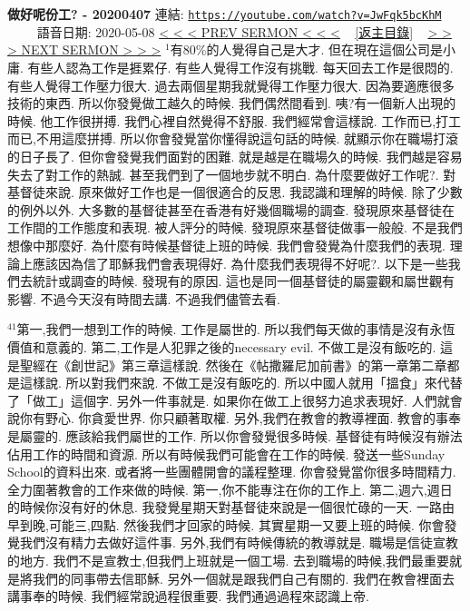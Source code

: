\documentclass{book}
\begin{document}
\section{}
\label{sec:JwFqk5bcKhM}
\textbf{做好呢份工? - 20200407}
\newline
\newline
連結: \href{https://youtube.com/watch?v=JwFqk5bcKhM}{\texttt{https://youtube.com/watch?v=JwFqk5bcKhM}} ~~~~ 語音日期: 2020-05-08
\newline
\newline
\hyperref[sec:UCyv23j5rVY]{\small{< < < PREV SERMON < < <}}
~
\hyperref[sec:index]{\small{[返主目錄]}}
~
\hyperref[sec:9pqygotXAuo]{\small{> > > NEXT SERMON > > >}}
\newline
\newline
$^{1}$有80\%的人覺得自己是大才.
但在現在這個公司是小庸.
有些人認為工作是捱累仔.
有些人覺得工作沒有挑戰.
每天回去工作是很悶的.
有些人覺得工作壓力很大.
過去兩個星期我就覺得工作壓力很大.
因為要適應很多技術的東西.
所以你發覺做工越久的時候.
我們偶然間看到.
咦?有一個新人出現的時候.
他工作很拼搏.
我們心裡自然覺得不舒服.
我們經常會這樣說.
工作而已,打工而已,不用這麼拼搏.
所以你會發覺當你懂得說這句話的時候.
就顯示你在職場打滾的日子長了.
但你會發覺我們面對的困難.
就是越是在職場久的時候.
我們越是容易失去了對工作的熱誠.
甚至我們到了一個地步就不明白.
為什麼要做好工作呢?.
對基督徒來說.
原來做好工作也是一個很適合的反思.
我認識和理解的時候.
除了少數的例外以外.
大多數的基督徒甚至在香港有好幾個職場的調查.
發現原來基督徒在工作間的工作態度和表現.
被人評分的時候.
發現原來基督徒做事一般般.
不是我們想像中那麼好.
為什麼有時候基督徒上班的時候.
我們會發覺為什麼我們的表現.
理論上應該因為信了耶穌我們會表現得好.
為什麼我們表現得不好呢?.
以下是一些我們去統計或調查的時候.
發現有的原因.
這也是同一個基督徒的屬靈觀和屬世觀有影響.
不過今天沒有時間去講.
不過我們儘管去看.

$^{41}$第一,我們一想到工作的時候.
工作是屬世的.
所以我們每天做的事情是沒有永恆價值和意義的.
第二,工作是人犯罪之後的necessary evil.
不做工是沒有飯吃的.
這是聖經在《創世記》第三章這樣說.
然後在《帖撒羅尼加前書》的第一章第二章都是這樣說.
所以對我們來說.
不做工是沒有飯吃的.
所以中國人就用「搵食」來代替了「做工」這個字.
另外一件事就是.
如果你在做工上很努力追求表現好.
人們就會說你有野心.
你貪愛世界.
你只顧著取權.
另外,我們在教會的教導裡面.
教會的事奉是屬靈的.
應該給我們屬世的工作.
所以你會發覺很多時候.
基督徒有時候沒有辦法佔用工作的時間和資源.
所以有時候我們可能會在工作的時候.
發送一些Sunday School的資料出來.
或者將一些團體開會的議程整理.
你會發覺當你很多時間精力.
全力圍著教會的工作來做的時候.
第一,你不能專注在你的工作上.
第二,週六,週日的時候你沒有好的休息.
我發覺星期天對基督徒來說是一個很忙碌的一天.
一路由早到晚,可能三,四點.
然後我們才回家的時候.
其實星期一又要上班的時候.
你會發覺我們沒有精力去做好這件事.
另外,我們有時候傳統的教導就是.
職場是信徒宣教的地方.
我們不是宣教士,但我們上班就是一個工場.
去到職場的時候,我們最重要就是將我們的同事帶去信耶穌.
另外一個就是跟我們自己有關的.
我們在教會裡面去講事奉的時候.
我們經常說過程很重要.
我們通過過程來認識上帝.
\end{document}
